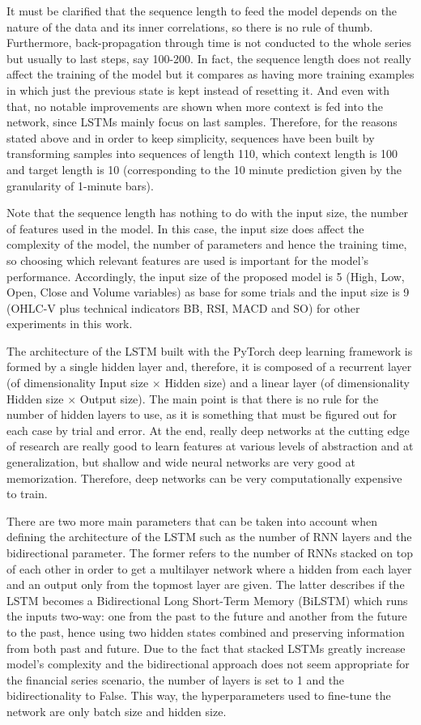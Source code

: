 \documentclass[10pt,twocolumn,letterpaper]{article}
\begin{document}
It must be clarified that the sequence length to feed the model depends on the nature of the data and its inner correlations, so there is no rule of thumb. Furthermore, back-propagation through time is not conducted to the whole series but usually to last steps, say 100-200. In fact, the sequence length does not really affect the training of the model but it compares as having more training examples in which just the previous state is kept instead of resetting it. And even with that, no notable improvements are shown when more context is fed into the network, since LSTMs mainly focus on last samples. Therefore, for the reasons stated above and in order to keep simplicity, sequences have been built by transforming samples into sequences of length 110, which context length is 100 and target length is 10 (corresponding to the 10 minute prediction given by the granularity of 1-minute bars).

Note that the sequence length has nothing to do with the input size, \ie the number of features used in the model. In this case, the input size does affect the complexity of the model, the number of parameters and hence the training time, so choosing which relevant features are used is important for the model's performance. Accordingly, the input size of the proposed model is 5 (\ie High, Low, Open, Close and Volume variables) as base for some trials and the input size is 9 (\ie OHLC-V plus technical indicators BB, RSI, MACD and SO) for other experiments in this work.

The architecture of the LSTM built with the PyTorch deep learning framework is formed by a single hidden layer and, therefore, it is composed of a recurrent layer (of dimensionality Input size $\times$ Hidden size) and a linear layer (of dimensionality Hidden size $\times$ Output size). The main point is that there is no rule for the number of hidden layers to use, as it is something that must be figured out for each case by trial and error. At the end, really deep networks at the cutting edge of research are really good to learn features at various levels of abstraction and at generalization, but shallow and wide neural networks are very good at memorization. Therefore, deep networks can be very computationally expensive to train.

There are two more main parameters that can be taken into account when defining the architecture of the LSTM such as the number of RNN layers and the bidirectional parameter. The former refers to the number of RNNs stacked on top of each other in order to get a multilayer network where a hidden from each layer and an output only from the topmost layer are given. The latter describes if the LSTM becomes a Bidirectional Long Short-Term Memory (BiLSTM) which runs the inputs two-way: one from the past to the future and another from the future to the past, hence using two hidden states combined and preserving information from both past and future. Due to the fact that stacked LSTMs greatly increase model’s complexity and the bidirectional approach does not seem appropriate for the financial series scenario, the number of layers is set to 1 and the bidirectionality to False. This way, the hyperparameters used to fine-tune the network are only batch size and hidden size.
\end{document}
